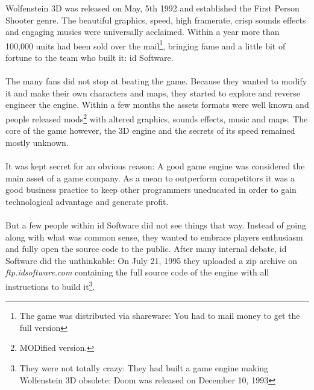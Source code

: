 Wolfenstein 3D was released on May, 5th 1992 and established the First Person Shooter genre. The beautiful graphics, speed, high framerate, crisp sounds effects and engaging musics were universally acclaimed. Within a year more than 100,000 units had been sold over the mail\footnote{The game was distributed via shareware: You had to mail money to get the full version}, bringing fame and a little bit of fortune to the team who built it: id Software.\\
\\
The many fans did not stop at beating the game. Because they wanted to modify it and make their own characters and maps, they started to explore and reverse engineer the engine. Within a few months the assets formats were well known and people released mods\footnote{MODified version.} with altered graphics, sounds effects, music and maps. The core of the game however, the 3D engine and the secrets of its speed remained mostly unknown.\\
\\
It was kept secret for an obvious reason: A good game engine was considered the main asset of a game company. As a mean to outperform competitors it was a good business practice to keep other programmers  uneducated in order to gain technological advantage and generate profit.\\
\\
But a few people within id Software did not see things that way. Instead of going along with what was common sense, they wanted to embrace players enthusiasm and fully open the source code to the public. After many internal debate, id Software did the unthinkable: On July 21, 1995 they uploaded a zip archive on \emph{ftp.idsoftware.com} containing the full source code of the engine with all instructions to build it\footnote{They were not totally crazy: They had built a game engine making Wolfenstein 3D obsolete: Doom was released on December 10, 1993}.\\


